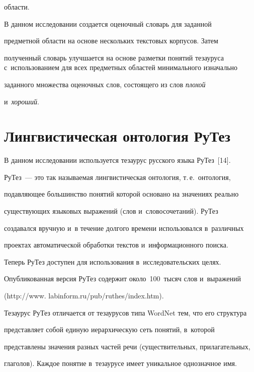 области.





     В данном исследовании создается оценочный словарь для заданной


предметной области на основе нескольких текстовых корпусов. Затем


полученный словарь улучшается на основе разметки понятий тезауруса с~использованием для всех предметных областей минимального изначально


заданного множества оценочных слов, состоящего из слов \textit{плохой}


и~\textit{хороший}.





\section{Лингвистическая онтология РуТез}





В данном исследовании используется тезаурус русского языка РуТез~[14].


РуТез~--- это так называемая лингвистическая онтология, т.\,е.\ онтология,


подавляющее большинство понятий которой основано на значениях реально


существующих языковых выражений (слов и~словосочетаний). РуТез


создавался вручную и~в течение долгого времени использовался в~различных


проектах автоматической обработки текстов и~информационного поиска.


Теперь РуТез доступен для использования в~исследовательских целях.


Опуб\-ли\-ко\-ванная версия РуТез содержит около~100~тысяч слов и~выражений


({\sf http://www. labinform.\linebreak ru/pub/ruthes/index.htm}).





Тезаурус РуТез отличается от тезаурусов типа WordNet тем, что его структура


представляет собой единую иерархическую сеть понятий, в~которой


представлены значения разных частей речи (существительных, прилагательных,


глаголов). Каждое понятие в~тезаурусе имеет уникальное однозначное имя.


